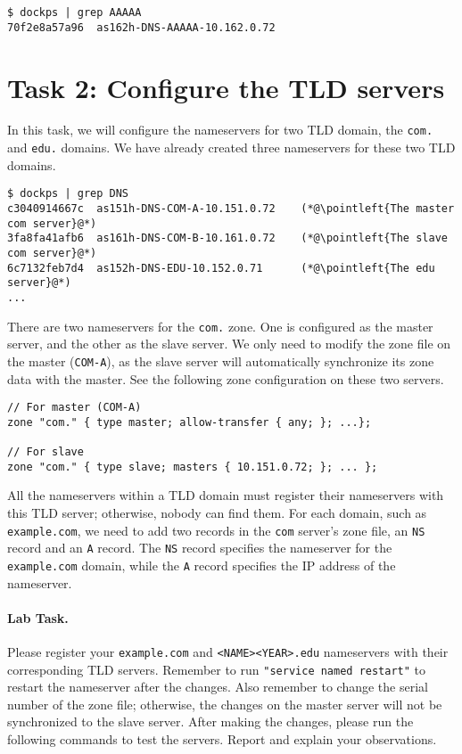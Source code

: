 \begin{lstlisting}
$ dockps | grep AAAAA
70f2e8a57a96  as162h-DNS-AAAAA-10.162.0.72
\end{lstlisting}




\section{Task 2: Configure the TLD servers}


In this task, we will configure the nameservers for two TLD domain,
the \texttt{com.} and \texttt{edu.} domains. We have already created
three nameservers for these two TLD domains. 

\begin{lstlisting}
$ dockps | grep DNS
c3040914667c  as151h-DNS-COM-A-10.151.0.72    (*@\pointleft{The master com server}@*) 
3fa8fa41afb6  as161h-DNS-COM-B-10.161.0.72    (*@\pointleft{The slave com server}@*)
6c7132feb7d4  as152h-DNS-EDU-10.152.0.71      (*@\pointleft{The edu server}@*)
...
\end{lstlisting}
 
There are two nameservers for the \texttt{com.} zone. One is configured as 
the master server, and the other as the slave server. 
We only need to modify the zone file on the master (\texttt{COM-A}), 
as the slave server will automatically synchronize its 
zone data with the master. See the following zone configuration
on these two servers. 

\begin{lstlisting}
// For master (COM-A)
zone "com." { type master; allow-transfer { any; }; ...};

// For slave
zone "com." { type slave; masters { 10.151.0.72; }; ... };
\end{lstlisting}


All the nameservers within a TLD domain
must register their nameservers with this
TLD server; otherwise, nobody can find them. 
For each domain, such as \texttt{example.com},  
we need to add two records in the \texttt{com} server's
zone file, an \texttt{NS} record and an \texttt{A} record.
The \texttt{NS} record specifies the nameserver for the
\texttt{example.com} domain, while the \texttt{A} record
specifies the IP address of the nameserver. 


\paragraph{Lab Task.}
Please register your \texttt{example.com} and \texttt{<NAME><YEAR>.edu} 
nameservers with their corresponding TLD servers. Remember to run
\texttt{"service named restart"}  to restart the nameserver after the
changes. Also remember to change the serial number of the zone file; otherwise,
the changes on the master server will not be synchronized to the 
slave server. After making the changes, please run the following commands
to test the servers. 
Report and explain your observations. 

